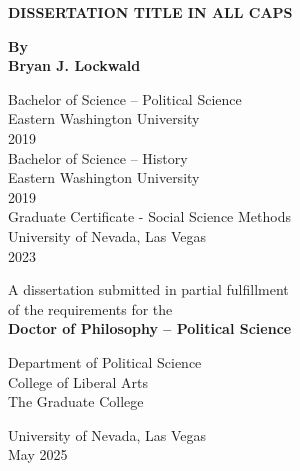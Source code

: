 \begin{center}
    \begin{doublespace}
        \textbf{DISSERTATION TITLE IN ALL CAPS} %
    \end{doublespace}
    
    \vspace*{1\baselineskip}
    
    \textbf{By}\\ %
    \textbf{Bryan J. Lockwald} %
    
    \vspace*{1\baselineskip}
    
    Bachelor of Science – Political Science\\
    Eastern Washington University\\
    2019\\
    
    Bachelor of Science – History\\
    Eastern Washington University\\
    2019\\ %
    
    Graduate Certificate - Social Science Methods\\
    University of Nevada, Las Vegas\\
    2023\\
    
    \vspace*{1\baselineskip}
    
    A dissertation submitted in partial fulfillment\\
    of the requirements for the\\
    \textbf{Doctor of Philosophy – Political Science}\\ %
    
    \vspace*{3\baselineskip}
    
    Department of Political Science\\ %
    College of Liberal Arts\\
    The Graduate College\\ %
    
    \vspace*{3\baselineskip}
    
    University of Nevada, Las Vegas\\
    May 2025\\ %
    
\end{center}
